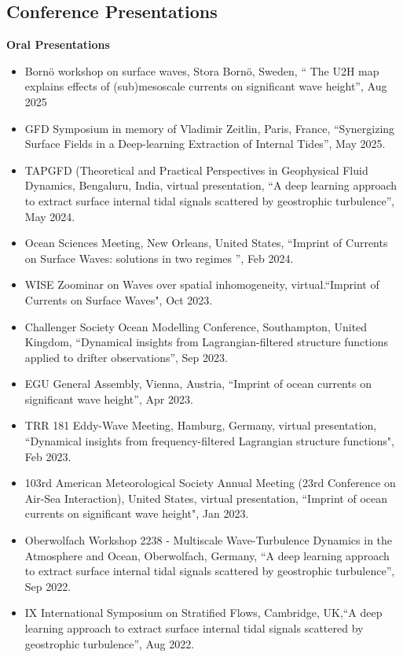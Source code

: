 \documentclass[a4paper,12pt]{article}
\begin{document}
\subsection{Conference Presentations}
\textbf{Oral Presentations}
\begin{itemize}[leftmargin=*,noitemsep]
\item Born\"{o} workshop on surface waves,  Stora Born\"{o}, Sweden,  `` The  U2H map  explains effects of (sub)mesoscale currents on significant wave height'', Aug 2025
\item GFD Symposium in memory of Vladimir Zeitlin, Paris, France, ``Synergizing Surface Fields in a Deep-learning Extraction of Internal Tides'', May 2025.
\item TAPGFD (Theoretical and Practical Perspectives in Geophysical Fluid Dynamics, Bengaluru, India, virtual presentation, ``A deep learning approach to extract surface internal tidal signals scattered by geostrophic turbulence”, May 2024.
\item Ocean Sciences Meeting, New Orleans,  United States, ``Imprint of Currents on Surface Waves: solutions in two regimes ”, Feb 2024.
\item WISE Zoominar on Waves over spatial inhomogeneity, virtual.``Imprint of Currents on Surface Waves", Oct 2023.
\item  Challenger Society Ocean Modelling Conference, Southampton, United Kingdom, ``Dynamical insights from Lagrangian-filtered structure functions applied to drifter observations”, Sep 2023.
\item EGU General Assembly, Vienna, Austria, ``Imprint of ocean currents on significant wave height”, Apr 2023.
\item  TRR 181 Eddy-Wave Meeting, Hamburg, Germany, virtual presentation, ``Dynamical insights from frequency-filtered Lagrangian structure functions", Feb 2023.
\item 103rd American Meteorological Society Annual Meeting (23rd Conference on Air-Sea Interaction), United States, virtual presentation, ``Imprint of ocean currents on significant wave height", Jan 2023.
\item Oberwolfach Workshop 2238 - Multiscale Wave-Turbulence Dynamics in the Atmosphere and Ocean, Oberwolfach, Germany, ``A deep learning approach to extract surface internal tidal signals scattered by geostrophic turbulence”, Sep 2022.
\item IX International Symposium on Stratified Flows, Cambridge, UK,``A deep learning approach to extract surface internal tidal signals scattered by geostrophic turbulence”, Aug 2022.

\end{itemize}
\end{document}
